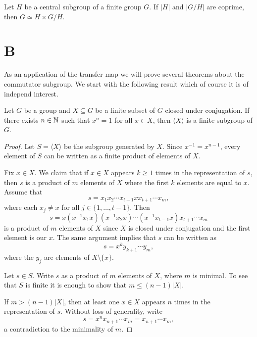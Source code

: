 \begin{exercise}
	Let $H$ be a central subgroup of a finite group $G$. If $|H|$
	and $|G/H|$ are coprime, then $G\simeq H\times G/H$.
\end{exercise}



\section*{B}

As an application of the transfer map we will prove several theorems
about the commutator subgroup. We start
with the following result which of course it is of independ interest. 

\begin{theorem}[Dietzmann]
	\label{theorem:Dietzmann} 
	Let $G$ be a group and $X\subseteq G$ be a finite subset of 
	$G$ closed under conjugation. If there exists $n\in\mathbb{N}$ such that 
	$x^n=1$ for all $x\in X$, then $\langle X\rangle$ is a finite subgroup of 
	$G$.
\end{theorem}

\begin{proof}
	Let $S=\langle X\rangle$ be the subgroup generated by $X$. Since $x^{-1}=x^{n-1}$, every element 
	of $S$ can be written as a finite product of elements of $X$. 
	
	Fix $x\in X$. We claim that if $x\in X$ appears $k\geq 1$ times in the representation of $s$, then 
	$s$ is a product of $m$
	elements of $X$ where the first $k$ elements are equal to $x$. Assume that 
	\[
	s=x_1x_2\cdots x_{t-1}xx_{t+1}\cdots x_m,
	\]
	where each $x_j\ne x$ for all $j\in\{1,\dots,t-1\}$. Then 
	\[
		s=x(x^{-1}x_1x)(x^{-1}x_2x)\cdots (x^{-1}x_{t-1}x)x_{t+1}\cdots x_m
	\]
	is a product of $m$ elements of $X$ since $X$ is closed under conjugation and
	the first element is our $x$. The same argument implies that $s$
	can be written as 
	\[
		s=x^ky_{k+1}\cdots y_m,
	\]
	where the $y_j$ are elements of $X\setminus\{x\}$.

	Let $s\in S$. Write $s$ as a product of $m$ elements of $X$,
	where $m$ is minimal. To see that $S$ is finite it is enough to show that  
	$m\leq (n-1)|X|$. 
	
	If $m>(n-1)|X|$, then 
	at least one $x\in X$ appears $n$ times in the representation of $s$. Without loss of generality, write
	\[
		s=x^nx_{n+1}\cdots x_m=x_{n+1}\cdots x_m,
	\]
	a contradiction to the minimality of $m$. 
\end{proof}


